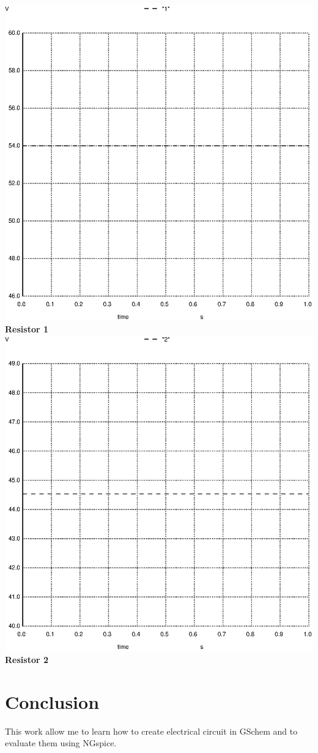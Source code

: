 \documentclass{article}
\begin{document}
\begin{center}
    \includegraphics[scale = 0.25]{picture/011.ps}\\
    \textbf{Resistor 1}\\
    \includegraphics[scale = 0.25]{picture/012.ps}\\
    \textbf{Resistor 2}
\end{center}

\section{Conclusion}

This work allow me to learn how to create electrical circuit in GSchem and to evaluate them using NGspice.
\end{document}
